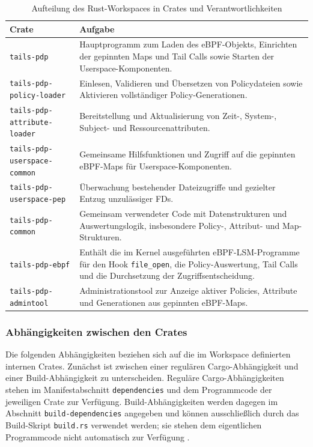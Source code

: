 \begin{table}[htbp]

    \centering
    \begin{tabular}{|p{5.3cm}|p{8.4cm}|}
        \hline
        \textbf{Crate} & \textbf{Aufgabe} \\
        \hline
        \texttt{tails-pdp} & Hauptprogramm zum Laden des eBPF-Objekts, Einrichten der gepinnten Maps und Tail Calls sowie Starten der Userspace-Komponenten. \\



        \hline
        \texttt{tails-pdp-policy-loader} & Einlesen, Validieren und Übersetzen von Policydateien sowie Aktivieren vollständiger Policy-Generationen. \\
        \hline
        \texttt{tails-pdp-attribute-loader} & Bereitstellung und Aktualisierung von Zeit-, System-, Subject- und Ressourcenattributen. \\
        \hline
        \texttt{tails-pdp-userspace-common} & Gemeinsame Hilfsfunktionen und Zugriff auf die gepinnten eBPF-Maps für Userspace-Komponenten. \\
        \hline
        \texttt{tails-pdp-userspace-pep} & Überwachung bestehender Dateizugriffe und gezielter Entzug unzulässiger FDs. \\
        \hline
        \texttt{tails-pdp-common} & Gemeinsam verwendeter Code mit Datenstrukturen und Auswertungslogik, insbesondere Policy-, Attribut- und Map-Strukturen. \\
        \hline
        \texttt{tails-pdp-ebpf} & Enthält die im Kernel ausgeführten eBPF-LSM-Programme für den Hook \texttt{file\_open}, die Policy-Auswertung, Tail Calls und die Durchsetzung der Zugriffsentscheidung. \\
        \hline

        \texttt{tails-pdp-admintool} & Administrationstool zur Anzeige aktiver Policies, Attribute und Generationen aus gepinnten eBPF-Maps. \\
        \hline
    \end{tabular}
    \caption{Aufteilung des Rust-Workspaces in Crates und Verantwortlichkeiten}
    \label{tab:rust-workspace-crates}
\end{table}





\subsubsection{Abhängigkeiten zwischen den Crates}
Die folgenden Abhängigkeiten beziehen sich auf die im Workspace definierten internen Crates.
Zunächst ist zwischen einer regulären Cargo-Abhängigkeit und einer Build-Abhängigkeit zu unterscheiden.
Reguläre Cargo-Abhängigkeiten stehen im Manifestabschnitt \texttt{dependencies} und dem Programmcode der jeweiligen Crate zur Verfügung.
Build-Abhängigkeiten werden dagegen im Abschnitt \texttt{build-dependencies} angegeben und können ausschließlich durch das Build-Skript \texttt{build.rs} verwendet werden; sie stehen dem eigentlichen Programmcode nicht automatisch zur Verfügung \citep{cargoBuildScripts}.


